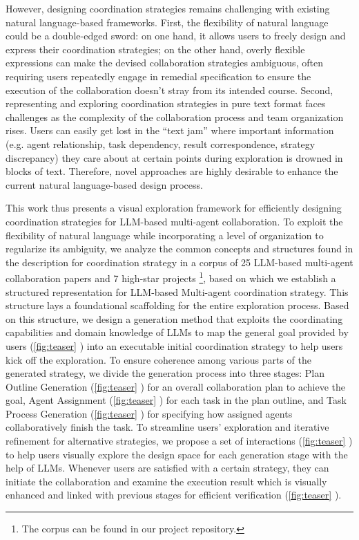 However, designing coordination strategies remains challenging with existing natural language-based frameworks. First, the flexibility of natural language could be a double-edged sword: on one hand, it allows users to freely design and express their coordination strategies; on the other hand, overly flexible expressions can make the devised collaboration strategies ambiguous, often requiring users repeatedly engage in remedial specification to ensure the execution of the collaboration doesn't stray from its intended course. Second, representing and exploring coordination strategies in pure text format faces challenges as the complexity of the collaboration process and team organization rises. Users can easily get lost in the ``text jam'' where important information (e.g. agent relationship, task dependency, result correspondence, strategy discrepancy) they care about at certain points during exploration is drowned in blocks of text. Therefore, novel approaches are highly desirable to enhance the current natural language-based design process.

This work thus presents a visual exploration framework for efficiently designing coordination strategies for LLM-based multi-agent collaboration. To exploit the flexibility of natural language while incorporating a level of organization to regularize its ambiguity, we analyze the common concepts and structures found in the description for coordination strategy in a corpus of 25 LLM-based multi-agent collaboration papers and 7 high-star projects \footnote[2]{{The corpus can be found in our project repository.}}, based on which we establish a structured representation for LLM-based Multi-agent coordination strategy. This structure lays a foundational scaffolding for the entire exploration process. Based on this structure, we design a generation method that exploits the coordinating capabilities and domain knowledge of LLMs to map the general goal provided by users (\cref{fig:teaser} ) into an executable initial coordination strategy to help users kick off the exploration. To ensure coherence among various parts of the generated strategy, we divide the generation process into three stages: Plan Outline Generation (\cref{fig:teaser} ) for an overall collaboration plan to achieve the goal, Agent Assignment (\cref{fig:teaser} ) for each task in the plan outline, and Task Process Generation (\cref{fig:teaser} ) for specifying how assigned agents collaboratively finish the task. To streamline users' exploration and iterative refinement for alternative strategies, we propose a set of interactions (\cref{fig:teaser}   ) to help users visually explore the design space for each generation stage with the help of LLMs. Whenever users are satisfied with a certain strategy, they can initiate the collaboration and examine the execution result which is visually enhanced and linked with previous stages for efficient verification (\cref{fig:teaser} \textbf{}). 

